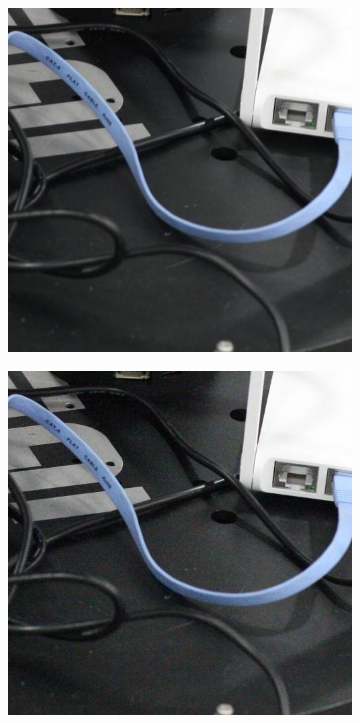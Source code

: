 \begin{figure}
\hfill
    \begin{subfigure}[t]{0.24\textwidth}
        \centering
        \includegraphics[width=1\textwidth]{images/dataset/Canon5D2_5_160_6400_reciever_1_mean.JPG}
    \end{subfigure} 
\hfill
    \begin{subfigure}[t]{0.24\textwidth}
        \centering
        \includegraphics[width=1\textwidth]{images/dataset/Canon5D2_5_160_6400_reciever_1_real.JPG}

\end{subfigure}
\end{figure}
